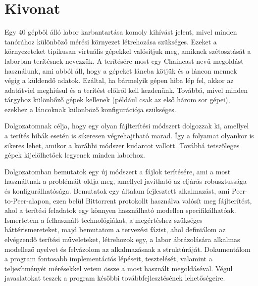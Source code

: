 \setcounter{page}{1}

\selecthungarian
\chapter*{Kivonat}

Egy 40 gépből álló labor karbantartása komoly kihívást jelent, mivel minden tanórához különböző mérési környezet létrehozása szükséges.
Ezeket a környezeteket tipikusan virtuális gépekkel valósítjuk meg, amiknek szétosztását a laborban terítésnek nevezzük. A terítésére most egy Chaincast nevű megoldást használunk, ami abból áll, hogy a gépeket láncba kötjük és a láncon mennek végig a küldendő adatok. Ezáltal, ha bármelyik gépen hiba lép fel, akkor az adatátviel meghiúsul és a terítést előlről kell kezdenünk. Továbbá, mivel minden tárgyhoz különbőző gépek kellenek (például csak az első három sor gépei), ezekhez a láncoknak különböző konfigurációja szükséges.

Dolgozatomnak célja, hogy egy olyan fájlterítési módszert dolgozzak ki, amellyel a terítés hibák esetén is sikeresen végrehajtható marad. Így a folyamat olyankor is sikeres lehet, amikor a korábbi módszer kudarcot vallott. Továbbá tetszőleges gépek kijelölhetőek legyenek minden laborhoz.

Dolgozatomban bemutatok egy új módszert a fájlok terítésére, ami a most használtnak a problémáit oldja meg, amellyel javítható az eljárás robusztussága és konfigurálhatósága. Bemutatok egy általam fejlesztett alkalmazást, ami Peer-to-Peer-alapon, ezen belül Bittorrent protokollt használva valósít meg fájlterítést, ahol a terítési feladatok egy könnyen használható modellen specifikálhatóak. Ismertetem a felhasznált technológiákat, a megértéshez szükséges háttérismereteket, majd bemutatom a tervezési fázist, ahol definiálom az elvégzendő terítési műveleteket, létrehozok egy, a labor ábrázolására alkalmas modellező nyelvet és felvázolom az alkalmazásnak a struktúráját. Dokumentálom a program fontosabb implementációs lépéseit, tesztelését, valamint a teljesítményét mérésekkel vetem össze a most használt megoldáséval. Végül javaslatokat teszek a program későbbi továbbfejlesztésének lehetőségeire.
\vfill

\selectenglish
